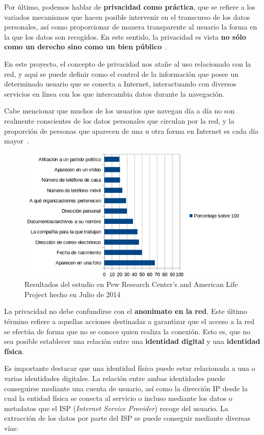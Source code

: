 Por último, podemos hablar de \textbf{privacidad como práctica}, que
se refiere a los variados mecanismos que hacen posible intervenir en
el transcurso de los datos personales, así como proporcionar de manera
transparente al usuario la forma en la que los datos son recogidos. En
este sentido, la privacidad es vista \textbf{no sólo como un derecho
  sino como un bien público}~\cite{lane2014privacy}.

En este proyecto, el concepto de privacidad nos atañe al uso
relacionado con la red, y aquí se puede definir como el control de la
información que posee un determinado usuario que se conecta a
Internet, interactuando con diversos servicios en línea con los que
intercambia datos durante la navegación.

Cabe mencionar que muchos de los usuarios que navegan día a día no son
realmente conscientes de los datos personales que circulan por la red,
y la proporción de personas que aparecen de una u otra forma en
Internet es cada día mayor~\cite{article:concernidos}.

\begin{figure}[H]
	\centerline{
		\mbox{\includegraphics[width=5.00in]{images/chart_privacy.png}}
	}
	\caption{Resultados del estudio en Pew Research Center's and American Life Project hecho en Julio de 2014~\cite{article:pew} }
	\label{fig:estudioPew}
\end{figure}

La privacidad no debe confundirse con el \textbf{anonimato en la
  red}. Este último término refiere a aquellas acciones destinadas a
garantizar que el acceso a la red se efectúa de forma que no se conoce
quien realiza la conexión. Esto es, que no sea posible establecer una
relación entre una \textbf{identidad digital} y una \textbf{identidad
  física}.

Es importante destacar que una identidad física puede estar
relacionada a una o varias identidades digitales. La relación entre
ambas identidades puede conseguirse mediante una cuenta de usuario,
así como la dirección IP desde la cual la entidad física se conecta al
servicio o incluso mediante los datos o metadatos que el ISP
(\textit{Internet Service Provider}) recoge del usuario. La extracción
de los datos por parte del ISP se puede conseguir mediante diversas
vías:

